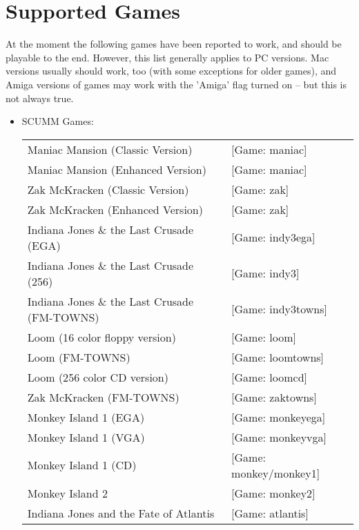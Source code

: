 


\section{Supported Games}

At the moment the following games have been reported to work, and should
be playable to the end. However, this list generally applies to PC versions.
Mac versions usually should work, too (with some exceptions for older games),
and Amiga versions of games may work with the 'Amiga' flag turned on -- but
this is not always true.

\begin{itemize}
\item SCUMM Games:\\
  \begin {tabular} [h] {ll}
    Maniac Mansion (Classic Version)&              [Game: maniac]\\
    Maniac Mansion (Enhanced Version)&             [Game: maniac]\\
    Zak McKracken (Classic Version)&               [Game: zak]\\
    Zak McKracken (Enhanced Version)&              [Game: zak]\\
    Indiana Jones \& the Last Crusade (EGA)&       [Game: indy3ega]\\
    Indiana Jones \& the Last Crusade (256)&       [Game: indy3]\\
    Indiana Jones \& the Last Crusade (FM-TOWNS)&  [Game: indy3towns]\\
    Loom (16 color floppy version)&                [Game: loom]\\
    Loom (FM-TOWNS)&                               [Game: loomtowns]\\
    Loom (256 color CD version)&                   [Game: loomcd]\\
    Zak McKracken (FM-TOWNS)&                      [Game: zaktowns]\\
    Monkey Island 1 (EGA)&                         [Game: monkeyega]\\
    Monkey Island 1 (VGA)&                         [Game: monkeyvga]\\
    Monkey Island 1 (CD)&                          [Game: monkey/monkey1]\\
    Monkey Island 2&                               [Game: monkey2]\\
    Indiana Jones and the Fate of Atlantis&        [Game: atlantis]\\

\end{tabular}
\end{itemize}
